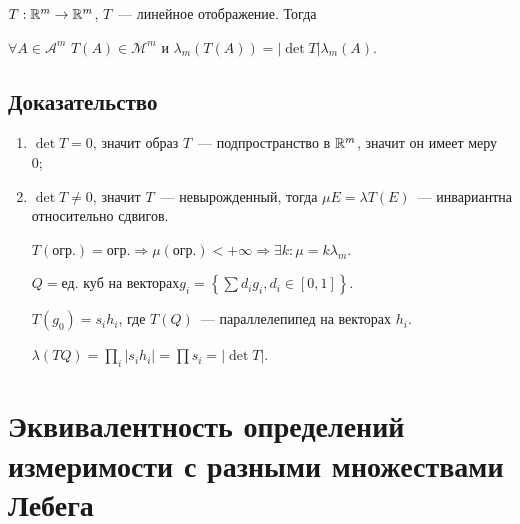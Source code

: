\documentclass{article}
\begin{document}
        $T : \mathbb{R}^m \rightarrow \mathbb{R}^m$, $T$~--- линейное отображение. Тогда
        
        $\forall A \in \mathcal{A}^m$ $T(A) \in \mathcal{M}^m$ и $\lambda_m(T(A)) = | \det T | \lambda_m(A)$.
        
        \subsection{Доказательство}
        
            \begin{enumerate}
            
                \item $\det T = 0$, значит образ $T$~--- подпространство в $\mathbb{R}^m$, значит он имеет меру 0;
                
                \item $\det T \neq 0$, значит $T$~--- невырожденный, тогда $\mu E = \lambda T(E)$~--- инвариантна относительно сдвигов.
                
                    $T(\text{огр.}) = \text{огр.} \Rightarrow \mu (\text{огр.}) < +\infty \Rightarrow \exists k : \mu = k \lambda_m$.
                    
                    $Q = \text{ед. куб на векторах} g_i = \left\{ \sum d_i g_i, d_i \in [0, 1] \right\}$.
                    
                    $T(g_0) = s_i h_i$, где $T(Q)$~--- параллелепипед на векторах $h_i$.
                    
                    $\lambda (T Q) = \prod\limits_i | s_i h_i | = \prod s_i = | \det T |$.
                    
            \end{enumerate}
            
    \newpage
    
    \section{Эквивалентность определений измеримости с разными множествами Лебега}
    
\end{document}
